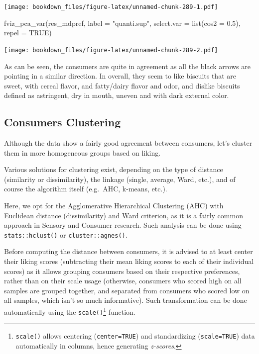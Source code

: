\documentclass[
]{krantz}
\makeatletter
\newenvironment{Shaded}{\begin{snugshade}}{\end{snugshade}}
\newcommand{\AttributeTok}[1]{\textcolor[rgb]{0.61,0.61,0.61}{#1}}
\newcommand{\ConstantTok}[1]{\textcolor[rgb]{0,0,0}{#1}}
\newcommand{\FloatTok}[1]{\textcolor[rgb]{0.06,0.06,0.06}{#1}}
\newcommand{\FunctionTok}[1]{\textcolor[rgb]{0,0,0}{#1}}
\newcommand{\NormalTok}[1]{#1}
\newcommand{\StringTok}[1]{\textcolor[rgb]{0.5,0.5,0.5}{#1}}
\renewenvironment{quote}{\begin{VF}}{\end{VF}}
\newenvironment{kframe}{%
\medskip{}
\setlength{\fboxsep}{.8em}
 \def\at@end@of@kframe{}%
 \ifinner\ifhmode%
  \def\at@end@of@kframe{\end{minipage}}%
  \begin{minipage}{\columnwidth}%
 \fi\fi%
 \def\FrameCommand##1{\hskip\@totalleftmargin \hskip-\fboxsep
 \colorbox{shadecolor}{##1}\hskip-\fboxsep
     \hskip-\linewidth \hskip-\@totalleftmargin \hskip\columnwidth}%
 \MakeFramed {\advance\hsize-\width
   \@totalleftmargin\z@ \linewidth\hsize
   \@setminipage}}%
 {\par\unskip\endMakeFramed%
 \at@end@of@kframe}
\renewenvironment{Shaded}{\begin{kframe}}{\end{kframe}}
\makeatother
\begin{document}
\texttt{[image: bookdown\_files/figure-latex/unnamed-chunk-289-1.pdf]}

\begin{Shaded}
\begin{Highlighting}[]
\FunctionTok{fviz\_pca\_var}\NormalTok{(res\_mdpref, }\AttributeTok{label =} \StringTok{"quanti.sup"}\NormalTok{, }
             \AttributeTok{select.var =} \FunctionTok{list}\NormalTok{(}\AttributeTok{cos2 =} \FloatTok{0.5}\NormalTok{), }\AttributeTok{repel =} \ConstantTok{TRUE}\NormalTok{)}
\end{Highlighting}
\end{Shaded}

\texttt{[image: bookdown\_files/figure-latex/unnamed-chunk-289-2.pdf]}

As can be seen, the consumers are quite in agreement as all the black arrows are pointing in a similar direction.
In overall, they seem to like biscuits that are sweet, with cereal flavor, and fatty/dairy flavor and odor, and dislike biscuits defined as astringent, dry in mouth, uneven and with dark external color.

\hypertarget{hac}{%
\subsection{Consumers Clustering}\label{hac}}

Although the data show a fairly good agreement between consumers, let's cluster them in more homogeneous groups based on liking.

Various solutions for clustering exist, depending on the type of distance (similarity or dissimilarity), the linkage (single, average, Ward, etc.), and of course the algorithm itself (e.g.~AHC, k-means, etc.).

Here, we opt for the Agglomerative Hierarchical Clustering (AHC) with Euclidean distance (dissimilarity) and Ward criterion, as it is a fairly common approach in Sensory and Consumer research. Such analysis can be done using \texttt{stats::hclust()} or \texttt{cluster::agnes()}.

\begin{quote}
Before computing the distance between consumers, it is advised to at least center their liking scores (subtracting their mean liking scores to each of their individual scores) as it allows grouping consumers based on their respective preferences, rather than on their scale usage (otherwise, consumers who scored high on all samples are grouped together, and separated from consumers who scored low on all samples, which isn't so much informative). Such transformation can be done automatically using the \texttt{scale()}\footnote{\texttt{scale()} allows centering (\texttt{center=TRUE}) and standardizing (\texttt{scale=TRUE}) data automatically in columns, hence generating \emph{z-scores}.} function.
\end{quote}
\end{document}
